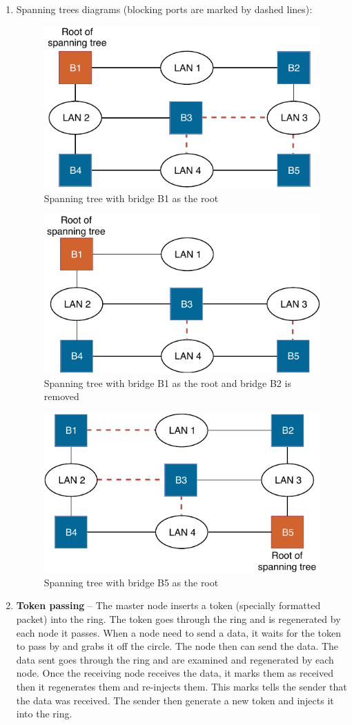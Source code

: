 \documentclass[a4paper, 11pt]{article}
\begin{document}
\begin{enumerate}
		\item %
			Spanning trees diagrams (blocking ports are marked by dashed lines):
			\begin{figure}[H]
				\centering
				\includegraphics[width=0.4\linewidth]{inc/spanning_tree_b1_root}
				\caption{Spanning tree with bridge B1 as the root}
				\label{figure:spanning_tree_b1_root}
			\end{figure}
			\begin{figure}[H]
				\centering
				\includegraphics[width=0.4\linewidth]{inc/spanning_tree_b1_root_b2_removed}
				\caption{Spanning tree with bridge B1 as the root and bridge B2 is removed}
				\label{figure:spanning_tree_b1_root_b2_removed}
			\end{figure}
			\begin{figure}[H]
				\centering
				\includegraphics[width=0.4\linewidth]{inc/spanning_tree_b5_root}
				\caption{Spanning tree with bridge B5 as the root}
				\label{figure:spanning_tree_b5_root}
			\end{figure}

		\item %
			\textbf{Token passing} -- The master node inserts a token (specially formatted packet) into the ring. The token goes through
			the ring and is regenerated by each node it passes. When a node need to send a data, it waits for the token to pass by and grabs
			it off the circle. The node then can send the data. The data sent goes through the ring and are examined and regenerated by
			each node. Once the receiving node receives the data, it marks them as received then it regenerates them and re-injects them.
			This marks tells the sender that the data was received. The sender then generate a new token and injects it into the ring.


\end{enumerate}
\end{document}
